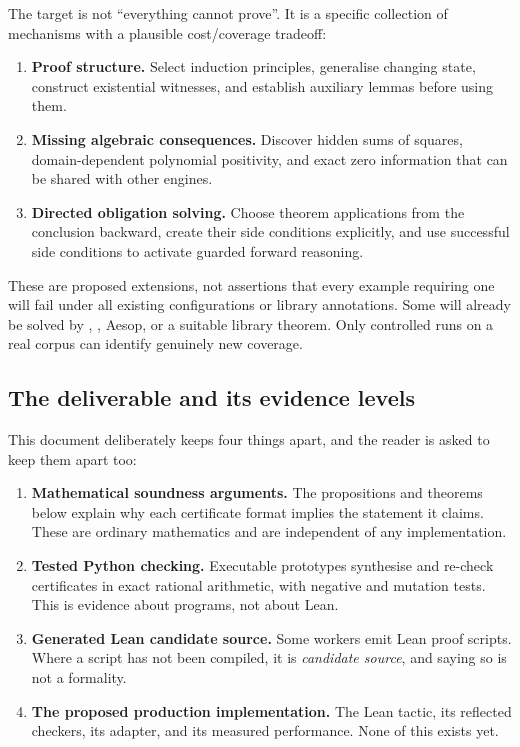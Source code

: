 The target is not ``everything \grind{} cannot prove''. It is a specific
collection of mechanisms with a plausible cost/coverage tradeoff:

\begin{enumerate}[leftmargin=1.4em]
\item \textbf{Proof structure.} Select induction principles, generalise
  changing state, construct existential witnesses, and establish auxiliary
  lemmas before using them.
\item \textbf{Missing algebraic consequences.} Discover hidden sums of
  squares, domain-dependent polynomial positivity, and exact zero information
  that can be shared with other engines.
\item \textbf{Directed obligation solving.} Choose theorem applications from
  the conclusion backward, create their side conditions explicitly, and use
  successful side conditions to activate guarded forward reasoning.
\end{enumerate}

These are proposed extensions, not assertions that every example requiring one
will fail under all existing \grind{} configurations or library annotations.
Some will already be solved by \grind{}, , Aesop, or a
suitable library theorem. Only controlled runs on a real corpus can identify
genuinely new coverage.

\subsection{The deliverable and its evidence levels}

This document deliberately keeps four things apart, and the reader is asked to
keep them apart too:

\begin{enumerate}[leftmargin=1.4em]
\item \textbf{Mathematical soundness arguments.} The propositions and theorems
  below explain why each certificate format implies the statement it claims.
  These are ordinary mathematics and are independent of any implementation.
\item \textbf{Tested Python checking.} Executable prototypes synthesise and
  re-check certificates in exact rational arithmetic, with negative and
  mutation tests. This is evidence about programs, not about Lean.
\item \textbf{Generated Lean candidate source.} Some workers emit Lean proof
  scripts. Where a script has not been compiled, it is \emph{candidate
  source}, and saying so is not a formality.
\item \textbf{The proposed production implementation.} The Lean tactic, its
  reflected checkers, its \grind{} adapter, and its measured performance.
  None of this exists yet.
\end{enumerate}

